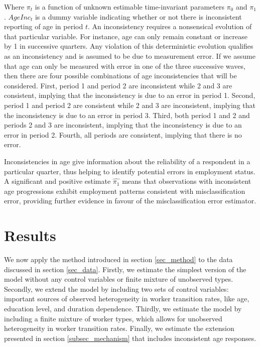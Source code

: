 \documentclass[letterpaper,12pt,final,dvipsnames]{article}
\begin{document}
Where $\pi_t$ is a function of unknown estimable time-invariant parameters $\pi_0$ and $\pi_1$. $AgeInc_t$ is a dummy variable indicating whether or not there is inconsistent reporting of age in period $t$. An inconsistency requires a nonsensical evolution of that particular variable. For instance, age can only remain constant or increase by 1 in successive quarters. Any violation of this deterministic evolution qualifies as an inconsistency and is assumed to be due to measurement error. If we assume that age can only be measured with error in one of the three successive waves, then there are four possible combinations of age inconsistencies that will be considered. First, period 1 and period 2 are inconsistent while 2 and 3 are consistent, implying that the inconsistency is due to an error in period 1. Second, period 1 and period 2 are consistent while 2 and 3 are inconsistent, implying that the inconsistency is due to an error in period 3. Third, both period 1 and 2 and periods 2 and 3 are inconsistent, implying that the inconsistency is due to an error in period 2. Fourth, all periods are consistent, implying that there is no error. 

Inconsistencies in age give information about the reliability of a respondent in a particular quarter, thus helping to identify potential errors in employment status. A significant and positive estimate $\hat{\pi_1}$ means that observations with inconsistent age progressions exhibit employment patterns consistent with misclassification error, providing further evidence in favour of the misclassification error estimator.


\section{Results} \label{sec_results}


We now apply the method introduced in section \ref{sec_method} to the data discussed in section \ref{sec_data}. Firstly, we estimate the simplest version of the model without any control variables or finite mixture of unobserved types. Secondly, we extend the model by including two sets of control variables: important sources of observed heterogeneity in worker transition rates, like age, education level, and duration dependence. Thirdly, we estimate the model by including a finite mixture of worker types, which allows for unobserved heterogeneity in worker transition rates. Finally, we estimate the extension presented in section \ref{subsec_mechanism} that includes inconsistent age responses. 
\end{document}

